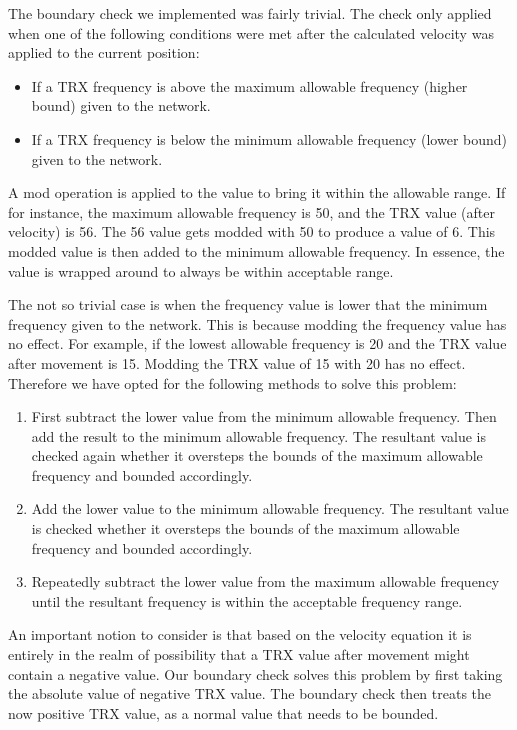 The boundary check we implemented was fairly trivial. The check only applied when one of the following conditions were met after the calculated velocity was applied to the current position:
\begin{itemize}
\item If a TRX frequency is above the maximum allowable frequency (higher bound) given to the network. 
\item If a TRX frequency is below the minimum allowable frequency (lower bound) given to the network.
\end{itemize}
A mod operation is applied to the value to bring it within the allowable range. If for instance, the maximum allowable frequency is 50, and the TRX value (after velocity) is 56. The 56 value gets modded with 50 to produce a value of 6. This modded value is then
added to the minimum allowable frequency. In essence, the value is wrapped around to always be within acceptable range. 

The not so trivial case is when the frequency value is lower that the minimum frequency given to the network. This is because modding the frequency value has no effect. For example, if the lowest allowable frequency is 20 and the TRX value after movement is 15.
Modding the TRX value of 15 with 20 has no effect. Therefore we have opted for the following methods to solve this problem:

\begin{enumerate}
\item First subtract the lower value from the minimum allowable frequency. Then add the result to the minimum allowable frequency. The resultant value is checked again whether it oversteps the bounds of the maximum allowable frequency and bounded accordingly.
\item Add the lower value to the minimum allowable frequency. The resultant value is checked whether it oversteps the bounds of the maximum allowable frequency and bounded accordingly.
\item Repeatedly subtract the lower value from the maximum allowable frequency until the resultant frequency is within the acceptable frequency range.
\end{enumerate}

An important notion to consider is that based on the velocity equation it is entirely in the realm of possibility that a TRX value after movement might contain a negative value. Our boundary check solves this problem by first taking the absolute value of negative TRX value. The boundary check then treats the now positive TRX value, as a normal value that needs to be bounded.

